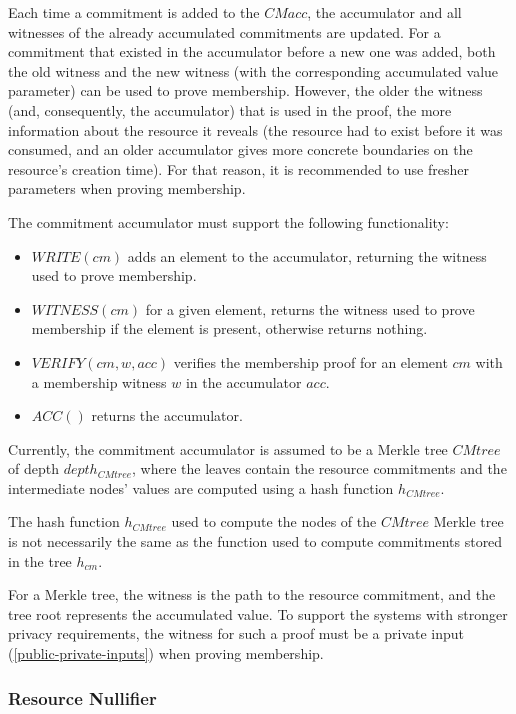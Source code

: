 \documentclass[
    11pt,            %
    techreport,        %
    affiltop,       %
]{art}
\begin{document}
Each time a commitment is added to the $CMacc$, the accumulator and all witnesses of the already accumulated commitments are updated.
For a commitment that existed in the accumulator before a new one was added, both the old witness and the new witness (with the corresponding accumulated value parameter) can be used to prove membership. However, the older the witness (and, consequently, the accumulator) that is used in the proof, the more information about the resource it reveals (the resource had to exist before it was consumed, and an older accumulator gives more concrete boundaries on the resource's creation time). For that reason, it is recommended to use fresher parameters when proving membership.

The commitment accumulator must support the following functionality:
\begin{itemize}
    \item $WRITE(cm)$ adds an element to the accumulator, returning the witness used to prove membership. 
    \item $WITNESS(cm)$ for a given element, returns the witness used to prove membership if the element is present, otherwise returns nothing.
    \item $VERIFY(cm, w, acc)$ verifies the membership proof for an element $cm$ with a membership witness $w$ in the accumulator $acc$.
    \item $ACC()$ returns the accumulator.
\end{itemize}

Currently, the commitment accumulator is assumed to be a Merkle tree $CMtree$ of depth $depth_{CMtree}$, where the leaves contain the resource commitments and the intermediate nodes' values are computed using a hash function $h_{CMtree}$. 

\begin{remark}
    The hash function $h_{CMtree}$ used to compute the nodes of the $CMtree$ Merkle tree is not necessarily the same as the function used to compute commitments stored in the tree $h_{cm}$.
\end{remark}

For a Merkle tree, the witness is the path to the resource commitment, and the tree root represents the accumulated value. To support the systems with stronger privacy requirements, the witness for such a proof must be a private input (\ref{public-private-inputs}) when proving membership.

\subsubsection{Resource Nullifier}\label{nf}
\end{document}

